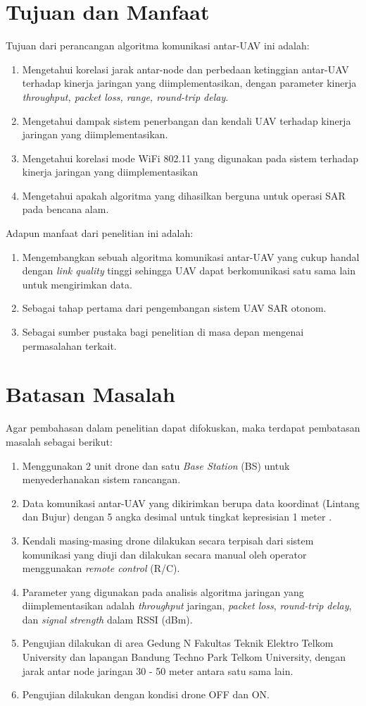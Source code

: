 \section{Tujuan dan Manfaat}
Tujuan dari perancangan algoritma komunikasi antar-UAV ini adalah:
\begin{enumerate}
	\item Mengetahui korelasi jarak antar-node dan perbedaan ketinggian antar-UAV terhadap kinerja jaringan yang diimplementasikan, dengan parameter kinerja \textit{throughput, packet loss, range, round-trip delay}.
	\item Mengetahui dampak sistem penerbangan dan kendali UAV terhadap kinerja jaringan yang diimplementasikan.
	\item Mengetahui korelasi mode WiFi 802.11 yang digunakan pada sistem terhadap kinerja jaringan yang diimplementasikan
	\item Mengetahui apakah algoritma yang dihasilkan berguna untuk operasi SAR pada bencana alam.
\end{enumerate}
Adapun manfaat dari penelitian ini adalah:
\begin{enumerate}
	\item Mengembangkan sebuah algoritma komunikasi antar-UAV yang cukup handal dengan \textit{link quality} tinggi sehingga UAV dapat berkomunikasi satu sama lain untuk mengirimkan data.
	\item Sebagai tahap pertama dari pengembangan sistem UAV SAR otonom.
	\item Sebagai sumber pustaka bagi penelitian di masa depan mengenai permasalahan terkait.
\end{enumerate}

\section{Batasan Masalah}
Agar pembahasan dalam penelitian dapat difokuskan, maka terdapat pembatasan masalah sebagai berikut:
\begin{enumerate}
	\item Menggunakan 2 unit drone dan satu \textit{Base Station} (BS) untuk menyederhanakan sistem rancangan.
	\item Data komunikasi antar-UAV yang dikirimkan berupa data koordinat (Lintang dan Bujur) dengan 5 angka desimal untuk tingkat kepresisian 1 meter \cite{PrecisionCoordinatesOpenStreetMap}.
	\item Kendali masing-masing drone dilakukan secara terpisah dari sistem komunikasi yang diuji dan dilakukan secara manual oleh operator menggunakan \textit{remote control} (R/C).
	\item Parameter yang digunakan pada analisis algoritma jaringan yang diimplementasikan adalah \textit{throughput} jaringan, \textit{packet loss},  \textit{round-trip delay}, dan \textit{signal strength} dalam RSSI (dBm).
	\item Pengujian dilakukan di area Gedung N Fakultas Teknik Elektro Telkom University dan lapangan Bandung Techno Park Telkom University, dengan jarak antar node jaringan 30 - 50 meter antara satu sama lain.
	\item Pengujian dilakukan dengan kondisi drone OFF dan ON.
\end{enumerate}

